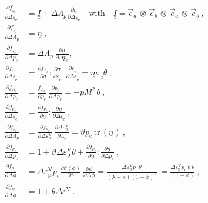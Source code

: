 \documentclass[paper=a4, twoside, pagesize]{scrartcl}
\newcommand{\tensor}[1]{\underline{#1}}
\newcommand{\tensorf}[1]{\underline{\underline{#1}}}
\renewcommand{\c}{\text{c}}
\newcommand{\e}{\text{e}}
\newcommand{\p}{\text{p}}
\newcommand{\with}{\text{with}}
\newcommand{\trace}{\mathrm{tr}\,}
\newcommand{\dyad}{\,\otimes\,}
\begin{document}
\begin{subequations}\label{eqset:partialDerivatives}
\begin{align}
  \frac{\partial\tensor f_{\!\varepsilon_\e}}{\partial\varDelta\tensor\varepsilon_\e} &= \tensorf I + \varDelta\varLambda_p\frac{\partial\tensor n}{\partial\varDelta\tensor\varepsilon_\e} \quad\with\quad \tensorf I=\vec e_a\dyad\vec e_b\dyad\vec e_a\dyad\vec e_b \ ,
  \\
  \frac{\partial\tensor f_{\!\varepsilon_\e}}{\partial\varDelta\varLambda_p} &= \tensor n\ ,
  \\
  \frac{\partial\tensor f_{\!\varepsilon_\e}}{\partial\varDelta p_\c} &= \varDelta\varLambda_p \ \frac{\partial\tensor n}{\partial\varDelta p_\c} ,
  \\[2mm]
  \frac{\partial f_{\!\varLambda_p}}{\partial\varDelta\tensor\varepsilon_\e} &= \frac{\partial f_{\!\varLambda_p}}{\partial \tensor\sigma} : \frac{\partial \tensor\sigma}{\partial \tensor\varepsilon_\e} : \frac{\partial\tensor\varepsilon_\e}{\partial\varDelta\tensor\varepsilon_\e} = \tensor m : \tensorf\ \theta\ , %
  \\
  \frac{\partial f_{\!\varLambda_p}}{\partial\varDelta p_\c} &= \frac{f_{\!\varLambda_p}}{\partial p_\c}\ \frac{\partial p_\c}{\partial \varDelta p_\c}
                                                              = -p M^2\, \theta\ , 
  \\[2mm]
  \frac{\partial f_{p_\c}}{\partial\varDelta\tensor\varepsilon_\e} &= \frac{\partial f_{p_\c}}{\partial\tensor n} : \frac{\partial\tensor n}{\partial\varDelta\tensor\varepsilon_\e}\ , 
  \\
  \frac{\partial f_{p_\c}}{\partial\varDelta\varLambda_p} &= \frac{\partial f_{p_\c}}{\partial\varDelta\varepsilon_\p^\text{V}}\ \frac{\partial\varDelta\varepsilon_\p^\text{V}}{\partial\varLambda_p} = \vartheta p_\c\,\trace(\tensor n)\ ,
  \\
  \frac{\partial f_{p_\c}}{\partial\varDelta p_\c} &= 1 + \vartheta\varDelta\varepsilon_\p^\text{V}\theta + \frac{\partial f_{p_\c}}{\partial\tensor n} : \frac{\partial\tensor n}{\partial\varDelta p_\c}\ ,
  \\
  \frac{\partial f_{p_\c}}{\partial\varDelta\phi} &= \varDelta\varepsilon_\p^\text{V} p_\c \frac{\partial\vartheta(\phi)}{\partial\phi}\ \frac{\partial\phi}{\partial\varDelta\phi} 
                                                   = \frac{\varDelta\varepsilon_\p^\text{V} p_\c\,\theta }{(\lambda - \kappa)(1 - \phi)^2}\ 
                                                   = \frac{\varDelta\varepsilon_\p^\text{V} p_\c\,\vartheta\,\theta }{(1 - \phi)}\ , 
  \\[2mm]
  \frac{\partial f_{\phi}}{\partial\varDelta\phi} &= 1 + \theta\varDelta\varepsilon^\text{V} \ .
\end{align}
\end{subequations}
\end{document}
